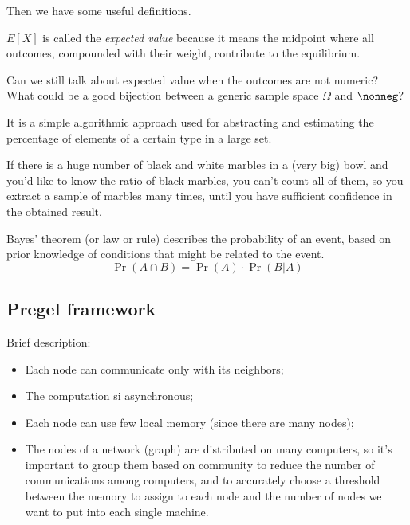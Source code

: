     Then we have some useful definitions.
    
    \begin{defn}
        $E[X]$ is called the \textit{expected value} because it means the midpoint where all outcomes, compounded with their weight, contribute to the equilibrium.
        
        \begin{qst}
            Can we still talk about expected value when the outcomes are not numeric? What could be a good bijection between a generic sample space $\Omega$ and $\nonneg$?
        \end{qst}
    \end{defn}
    
    \begin{defn}[Sampling]
        It is a simple algorithmic approach used for abstracting and estimating the percentage of elements of a certain type in a large set.
        
        \ex If there is a huge number of black and white marbles in a (very big) bowl and you'd like to know the ratio of black marbles, you can't count all of them, so you extract a sample of marbles many times, until you have sufficient confidence in the obtained result.
    \end{defn}
    
    \begin{defn}
        Bayes’ theorem (or law or rule) describes the probability of an event, based on prior knowledge of conditions that might be related to the event.
        \begin{equation}\label{eq-bayes}
            \Pr{(A \cap B)} = \Pr{(A)} \cdot \Pr{(B | A)}
        \end{equation}
    \end{defn}


\subsection{Pregel framework}

    Brief description:
    \begin{itemize}
        \item Each node can communicate only with its neighbors;
        \item The computation si asynchronous;
        \item Each node can use few local memory (since there are many nodes);
        \item The nodes of a network (graph) are distributed on many computers, so it's important to group them based on community to reduce the number of communications among computers, and to accurately choose a threshold between the memory to assign to each node and the number of nodes we want to put into each single machine.
    \end{itemize}
    
